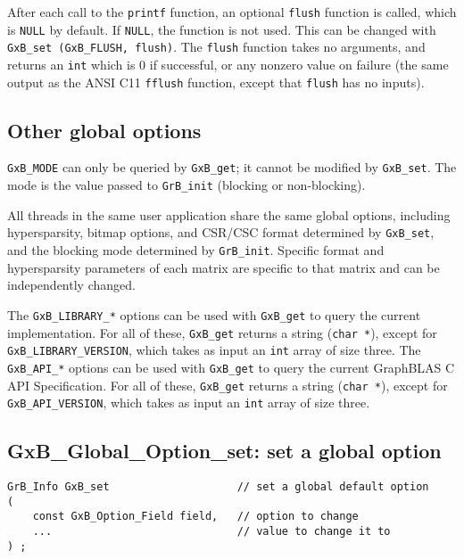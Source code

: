 \documentclass[12pt]{article}
\begin{document}
After each call to the \verb'printf' function, an optional
\verb'flush' function is called, which is \verb'NULL' by default.  If
\verb'NULL', the function is not used.  This can be changed with
\verb'GxB_set (GxB_FLUSH, flush)'.  The \verb'flush' function takes no
arguments, and returns an \verb'int' which is 0 if successful, or any nonzero
value on failure (the same output as the ANSI C11 \verb'fflush' function,
except that \verb'flush' has no inputs).

\subsection{Other global options}

\verb'GxB_MODE' can only be
queried by \verb'GxB_get'; it cannot be modified by \verb'GxB_set'.  The mode
is the value passed to \verb'GrB_init' (blocking or non-blocking).

All threads in the same user application share the same global options,
including hypersparsity, bitmap options, and CSR/CSC format determined by
\verb'GxB_set', and the blocking mode determined by \verb'GrB_init'.
Specific format and hypersparsity parameters of each matrix are specific to
that matrix and can be independently changed.

The \verb'GxB_LIBRARY_*' options can be used with \verb'GxB_get' to query the
current implementation.  For all of these, \verb'GxB_get' returns a string
(\verb'char *'), except for \verb'GxB_LIBRARY_VERSION', which takes as input an
\verb'int' array of size three.  The \verb'GxB_API_*' options can be used with
\verb'GxB_get' to query the current GraphBLAS C API Specification.  For all of
these, \verb'GxB_get' returns a string (\verb'char *'), except for
\verb'GxB_API_VERSION', which takes as input an \verb'int' array of size three.  

\subsection{{\sf GxB\_Global\_Option\_set:} set a global option}

\begin{mdframed}[userdefinedwidth=6in]
{\footnotesize
\begin{verbatim}
GrB_Info GxB_set                    // set a global default option
(
    const GxB_Option_Field field,   // option to change
    ...                             // value to change it to
) ;
\end{verbatim} } \end{mdframed}
\end{document}
